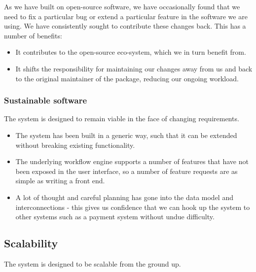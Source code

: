 \documentclass[12pt,a4paper,twosided]{article}
\begin{document}
As we have built on open-source software, we have occasionally found
that we need to fix a particular bug or extend a particular feature in
the software we are using. We have consistently sought to contribute
these changes back. This has a number of benefits:

\begin{itemize}

\item
  It contributes to the open-source eco-system, which we in turn benefit
  from.
\item
  It shifts the responsibility for maintaining our changes away from us
  and back to the original maintainer of the package, reducing our
  ongoing workload.
\end{itemize}

\subsubsection{Sustainable software}

The system is designed to remain viable in the face of changing
requirements.

\begin{itemize}

\item
  The system has been built in a generic way, such that it can be
  extended without breaking existing functionality.
\item
  The underlying workflow engine supports a number of features that have
  not been exposed in the user interface, so a number of feature
  requests are as simple as writing a front end.
\item
  A lot of thought and careful planning has gone into the data model and
  interconnections - this gives us confidence that we can hook up the
  system to other systems such as a payment system without undue
  difficulty.
\end{itemize}

\subsection{Scalability}

The system is designed to be scalable from the ground up.
\end{document}
